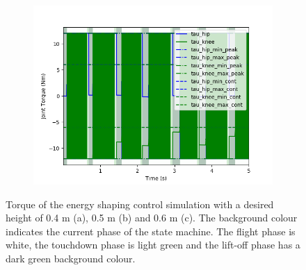 \documentclass[onecolumn, letter paper]{report}
\begin{document}
\begin{figure}[htb!]
\begin{subfigure}{.49\textwidth}
    \includegraphics[width=\textwidth]{figures/sim0.6m/joint_efforts.png}
    \end{subfigure}
    \caption{Torque of the energy shaping control simulation with a desired height of 0.4 m (a), 0.5 m (b) and 0.6 m (c). The background colour indicates the current phase of the state machine. The flight phase is white, the touchdown phase is light green and the lift-off phase has a dark green background colour.}
    \label{fig:simtorque}
\end{figure}








\end{document}
